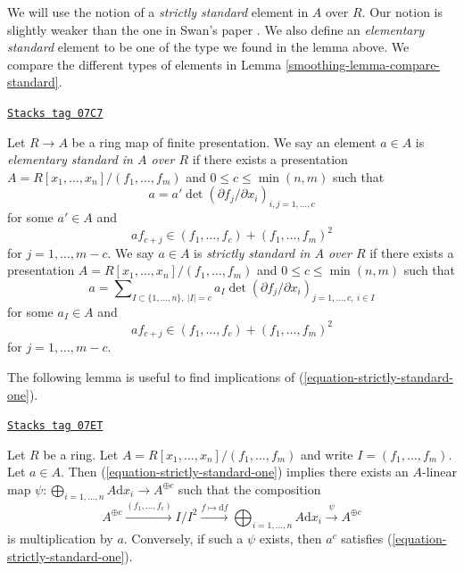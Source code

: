 We will use the notion of a {\it strictly standard} element in
$A$ over $R$. Our notion is slightly weaker than the
one in Swan's paper \cite{swan}. We also define an {\it elementary
standard} element to be one of the type we found in the lemma above.
We compare the different types of elements in
Lemma \ref{smoothing-lemma-compare-standard}.

\begin{definition}
\label{smoothing-definition-strictly-standard}
\href{https://stacks.math.columbia.edu/tag/07C7}{\texttt{Stacks tag 07C7}}

Let $R \to A$ be a ring map of finite presentation.
We say an element $a \in A$ is {\it elementary standard in $A$ over $R$}
if there exists a presentation
$A = R[x_1, \ldots, x_n]/(f_1, \ldots, f_m)$
and $0 \leq c \leq \min(n, m)$ such that
\begin{equation}
\label{equation-elementary-standard-one}
a = a' \det(\partial f_j/\partial x_i)_{i, j = 1, \ldots, c}
\end{equation}
for some $a' \in A$ and
\begin{equation}
\label{equation-elementary-standard-two}
a f_{c + j} \in (f_1, \ldots, f_c) + (f_1, \ldots, f_m)^2
\end{equation}
for $j = 1, \ldots, m - c$. We say $a \in A$ is
{\it strictly standard in $A$ over $R$} if there exists a presentation
$A = R[x_1, \ldots, x_n]/(f_1, \ldots, f_m)$
and $0 \leq c \leq \min(n, m)$ such that
\begin{equation}
\label{equation-strictly-standard-one}
a = \sum\nolimits_{I \subset \{1, \ldots, n\},\ |I| = c}
a_I \det(\partial f_j/\partial x_i)_{j = 1, \ldots, c,\ i \in I}
\end{equation}
for some $a_I \in A$ and
\begin{equation}
\label{equation-strictly-standard-two}
a f_{c + j} \in (f_1, \ldots, f_c) + (f_1, \ldots, f_m)^2
\end{equation}
for $j = 1, \ldots, m - c$.
\end{definition}

The following lemma is useful to find implications of
(\ref{equation-strictly-standard-one}).

\begin{lemma}
\label{smoothing-lemma-parse-equation-strictly-standard-one}
\href{https://stacks.math.columbia.edu/tag/07ET}{\texttt{Stacks tag 07ET}}

Let $R$ be a ring. Let $A = R[x_1, \ldots, x_n]/(f_1, \ldots, f_m)$
and write $I = (f_1, \ldots, f_m)$. Let $a \in A$. Then
(\ref{equation-strictly-standard-one}) implies
there exists an $A$-linear map
$\psi : \bigoplus\nolimits_{i = 1, \ldots, n} A \text{d}x_i \to A^{\oplus c}$
such that the composition
$$
A^{\oplus c} \xrightarrow{(f_1, \ldots, f_c)}
I/I^2 \xrightarrow{f \mapsto \text{d}f}
\bigoplus\nolimits_{i = 1, \ldots, n} A \text{d}x_i
\xrightarrow{\psi}
A^{\oplus c}
$$
is multiplication by $a$. Conversely, if such a $\psi$ exists, then
$a^c$ satisfies (\ref{equation-strictly-standard-one}).
\end{lemma}

